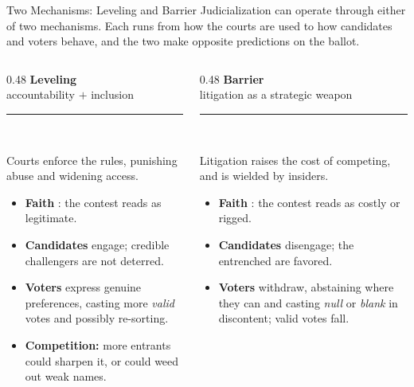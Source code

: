 

\begin{frame}[t]{Two Mechanisms: Leveling and Barrier}
\hypertarget{src:twofaces}{}
\small
Judicialization can operate through either of two mechanisms. Each runs from how the courts are used to how candidates and voters behave, and the two make opposite predictions on the ballot.
\vspace{1pt}
\begin{columns}[T]
\begin{column}{0.48\textwidth}
\centering\textbf{\textcolor{mygreen}{\large Leveling}}\\[-1pt]
{\scriptsize accountability $+$ inclusion }\\[1pt]
\rule{\linewidth}{0.4pt}\\[1pt]
\raggedright\footnotesize
Courts enforce the rules, punishing abuse and widening access.
\begin{itemize}\itemsep0pt
  \item \textbf{Faith} \pos{$\uparrow$}: the contest reads as legitimate.
  \item \textbf{Candidates} engage; credible challengers are not deterred.
  \item \textbf{Voters} express genuine preferences, casting more \emph{valid} votes and possibly re-sorting.
  \item[\ns{?}] \textbf{Competition:} more entrants could sharpen it, or could weed out weak names. 
\end{itemize}
\end{column}
\begin{column}{0.48\textwidth}
\centering\textbf{\textcolor{myred}{\large Barrier}}\\[-1pt]
{\scriptsize litigation as a strategic weapon }\\[1pt]
\rule{\linewidth}{0.4pt}\\[1pt]
\raggedright\footnotesize
Litigation raises the cost of competing, and is wielded by insiders.
\begin{itemize}\itemsep0pt
  \item \textbf{Faith} \negt{$\downarrow$}: the contest reads as costly or rigged.
  \item \textbf{Candidates} disengage; the entrenched are favored.
  \item \textbf{Voters} withdraw, abstaining where they can and casting \emph{null} or \emph{blank} in discontent; valid votes fall.

\end{itemize}
\end{column}
\end{columns}
\end{frame}
